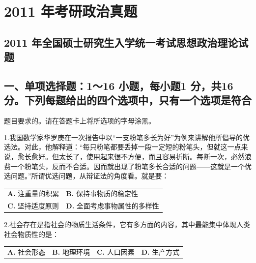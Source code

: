 \documentclass[UTF8,11pt]{ctexart}
\begin{document}
\section*{2011 年考研政治真题}
\subsection*{2011 年全国硕士研究生入学统一考试思想政治理论试题}

\subsection*{一、单项选择题：1～16 小题，每小题1 分，共16 分。下列每题给出的四个选项中，只有一个选项是符合}

题目要求的。请在答题卡上将所选项的字母涂黑。


1.我国数学家华罗庚在一次报告中以“一支粉笔多长为好”为例来讲解他所倡导的优选法。对此，他解释道：“每只粉笔都要丢掉一段一定短的粉笔头，但就这一点来说，愈长愈好。但太长了，使用起来很不方便，而且容易折断。每断一次，必然浪费一个粉笔头，反而不合适。因而就出现了粉笔多长合适的问题——这就是一个优选问题。”所谓优选问题，从辩证法的角度看。就是要：


\begin{center}\begin{tabular}{>{\raggedright\arraybackslash}p{\dimexpr(\linewidth-4\tabcolsep)/2\relax}>{\raggedright\arraybackslash}p{\dimexpr(\linewidth-4\tabcolsep)/2\relax}}
\textbf{A.} 注重量的积累 & \textbf{B.} 保持事物质的稳定性\\[.35em]
\textbf{C.} 坚持适度原则 & \textbf{D.} 全面考虑事物属性的多样性\\[.35em]\end{tabular}\end{center}

2.社会存在是指社会的物质生活条件，它有多方面的内容，其中最能集中体现人类社会物质性的是：


\begin{center}\begin{tabular}{>{\raggedright\arraybackslash}p{\dimexpr(\linewidth-8\tabcolsep)/4\relax}>{\raggedright\arraybackslash}p{\dimexpr(\linewidth-8\tabcolsep)/4\relax}>{\raggedright\arraybackslash}p{\dimexpr(\linewidth-8\tabcolsep)/4\relax}>{\raggedright\arraybackslash}p{\dimexpr(\linewidth-8\tabcolsep)/4\relax}}
\textbf{A.} 社会形态 & \textbf{B.} 地理环境 & \textbf{C.} 人口因素 & \textbf{D.} 生产方式\\[.35em]\end{tabular}\end{center}
\end{document}
